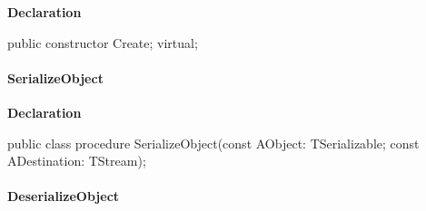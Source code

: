 \documentclass{report}
\newif\ifpdf
\begin{document}
\label{PasDoc_Serialize.TSerializable-Create}
\begin{list}{}{
\setlength{\itemindent}{0cm}
\setlength{\listparindent}{0cm}
\setlength{\leftmargin}{\evensidemargin}
\addtolength{\leftmargin}{\tmplength}
\settowidth{\labelsep}{X}
\addtolength{\leftmargin}{\labelsep}
\setlength{\labelwidth}{\tmplength}
}
\item[\textbf{Declaration}\hfill]
\ifpdf
\begin{flushleft}
\fi
\begin{ttfamily}
public constructor Create; virtual;\end{ttfamily}

\ifpdf
\end{flushleft}
\fi

\end{list}
\paragraph*{SerializeObject}\hspace*{\fill}

\label{PasDoc_Serialize.TSerializable-SerializeObject}
\begin{list}{}{
\setlength{\itemindent}{0cm}
\setlength{\listparindent}{0cm}
\setlength{\leftmargin}{\evensidemargin}
\addtolength{\leftmargin}{\tmplength}
\settowidth{\labelsep}{X}
\addtolength{\leftmargin}{\labelsep}
\setlength{\labelwidth}{\tmplength}
}
\item[\textbf{Declaration}\hfill]
\ifpdf
\begin{flushleft}
\fi
\begin{ttfamily}
public class procedure SerializeObject(const AObject: TSerializable; const ADestination: TStream);\end{ttfamily}

\ifpdf
\end{flushleft}
\fi

\end{list}
\paragraph*{DeserializeObject}\hspace*{\fill}
\end{document}
